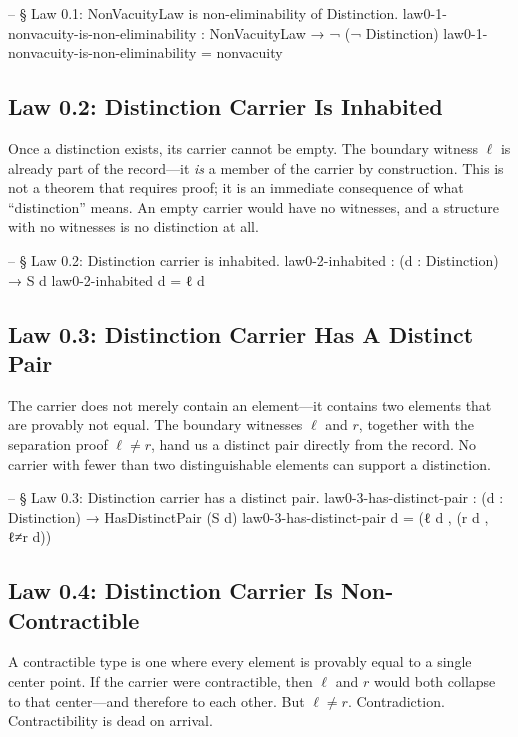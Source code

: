 \documentclass[11pt,a4paper]{book}
\begin{document}
\begin{code}
-- § Law 0.1: NonVacuityLaw is non-eliminability of Distinction.
law0-1-nonvacuity-is-non-eliminability :
  NonVacuityLaw → ¬ (¬ Distinction)
law0-1-nonvacuity-is-non-eliminability = nonvacuity
\end{code}

\subsection{Law 0.2: Distinction Carrier Is Inhabited}

Once a distinction exists, its carrier cannot be empty. The boundary witness $\ell$ is already part of the record—it \textit{is} a member of the carrier by construction. This is not a theorem that requires proof; it is an immediate consequence of what ``distinction'' means. An empty carrier would have no witnesses, and a structure with no witnesses is no distinction at all.

\begin{code}
-- § Law 0.2: Distinction carrier is inhabited.
law0-2-inhabited : (d : Distinction) → S d
law0-2-inhabited d = ℓ d
\end{code}

\subsection{Law 0.3: Distinction Carrier Has A Distinct Pair}

The carrier does not merely contain an element—it contains two elements that are provably not equal. The boundary witnesses $\ell$ and $r$, together with the separation proof $\ell \neq r$, hand us a distinct pair directly from the record. No carrier with fewer than two distinguishable elements can support a distinction.

\begin{code}
-- § Law 0.3: Distinction carrier has a distinct pair.
law0-3-has-distinct-pair : (d : Distinction) → HasDistinctPair (S d)
law0-3-has-distinct-pair d = (ℓ d , (r d , ℓ≠r d))
\end{code}

\subsection{Law 0.4: Distinction Carrier Is Non-Contractible}

A contractible type is one where every element is provably equal to a single center point. If the carrier were contractible, then $\ell$ and $r$ would both collapse to that center—and therefore to each other. But $\ell \neq r$. Contradiction. Contractibility is dead on arrival.
\end{document}
